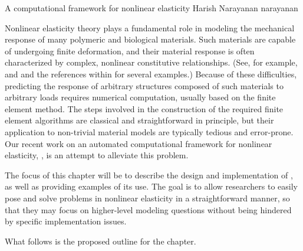 \def\bone{{1}}
\def\Bepsilon{\mbox{$\epsilon$}}
\def\Bvarphi{\mbox{$\varphi$}}
\def\bB{\mbox{$ B$}}
\def\bC{\mbox{$ C$}}
\def\bE{\mbox{$ E$}}
\def\bF{\mbox{$ F$}}
\def\bN{\mbox{$ N$}}
\def\bP{\mbox{$ P$}}
\def\bS{\mbox{$ S$}}
\def\bT{\mbox{$ T$}}
\def\bX{\mbox{$ X$}}
\def\ba{\mbox{$ a$}}
\def\bb{\mbox{$ b$}}
\def\be{\mbox{$ e$}}
\def\bg{\mbox{$ g$}}
\def\br{\mbox{$ r$}}
\def\bu{\mbox{$ u$}}
\def\bv{\mbox{$ v$}}
\def\bw{\mbox{$ w$}}
\def\twist{\emp{CBC.Twist}}

              {A computational framework for nonlinear elasticity}
              {Harish Narayanan}
              {narayanan}

Nonlinear elasticity theory plays a fundamental role in modeling the
mechanical response of many polymeric and biological materials. Such
materials are capable of undergoing finite deformation, and their
material response is often characterized by complex, nonlinear
constitutive relationships. (See, for example, \citet{Holzapfel2000}
and \citet{TruesdellNoll1965} and the references within for several
examples.) Because of these difficulties, predicting the response of
arbitrary structures composed of such materials to arbitrary loads
requires numerical computation, usually based on the finite element
method. The steps involved in the construction of the required finite
element algorithms are classical and straightforward in principle, but
their application to non-trivial material models are typically tedious
and error-prone. Our recent work on an automated computational
framework for nonlinear elasticity, \twist, is an attempt to alleviate
this problem.

The focus of this chapter will be to describe the design and
implementation of \twist, as well as providing examples of its
use. The goal is to allow researchers to easily pose and solve
problems in nonlinear elasticity in a straightforward manner, so that
they may focus on higher-level modeling questions without being
hindered by specific implementation issues.

What follows is the proposed outline for the chapter.

